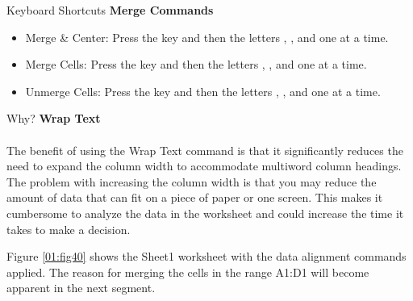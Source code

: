 \begin{center}
	\begin{shtcutbox}{Keyboard Shortcuts}
		\textbf{Merge Commands}
		\\
		\begin{itemize}
			\setlength{\itemsep}{0pt}
			\setlength{\parskip}{0pt}
			\setlength{\parsep}{0pt}
			
			\item Merge \& Center: Press the  key and then the letters , , and  one at a time.
			\item Merge Cells: Press the  key and then the letters , , and  one at a time.
			\item Unmerge Cells: Press the  key and then the letters , , and  one at a time.
			
		\end{itemize}
	\end{shtcutbox}
\end{center}

\begin{center}
	\begin{infobox}{Why?}
		\textbf{Wrap Text}
		\\
		\\
		The benefit of using the Wrap Text command is that it significantly reduces the need to expand the column width to accommodate multiword column headings. The problem with increasing the column width is that you may reduce the amount of data that can fit on a piece of paper or one screen. This makes it cumbersome to analyze the data in the worksheet and could increase the time it takes to make a decision.
	\end{infobox}
\end{center}

Figure \ref{01:fig40} shows the Sheet1 worksheet with the data alignment commands applied. The reason for merging the cells in the range \textsf{A1:D1} will become apparent in the next segment.

